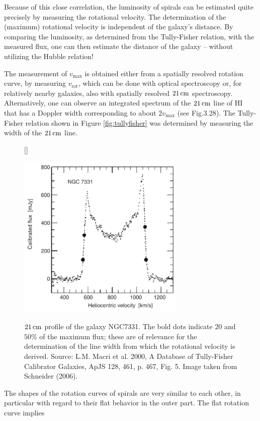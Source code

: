 \documentclass[a4paper,10pt]{article}
\begin{document}
{\noindent}Because of this close correlation, the luminosity of spirals can be estimated quite precisely by measuring the rotational velocity. The determination of the (maximum) rotational velocity is independent of the galaxy’s distance. By comparing the luminosity, as determined from the Tully-Fisher relation, with the measured flux, one can then estimate the distance of the galaxy -- without utilizing the Hubble relation!

{\noindent}The measurement of $v_\mathrm{max}$ is obtained either from a spatially resolved rotation curve, by measuring $v_\mathrm{rot}$, which can be done with optical spectroscopy or, for relatively nearby galaxies, also with spatially resolved $21\,{\rm cm}$ spectroscopy. Alternatively, one can observe an integrated spectrum of the $21\,{\rm cm}$ line of HI that has a Doppler width corresponding to about $2v_\mathrm{max}$ (see Fig.3.28). The Tully-Fisher relation shown in Figure \ref{fig:tullyfisher} was determined by measuring the width of the $21\,{\rm cm}$ line.

\begin{figure}[h]
    [\FBwidth]
    {\caption{\footnotesize{$21\,{\rm cm}$ profile of the galaxy NGC7331. The bold dots indicate $20$ and $50$\% of the maximum flux; these are of relevance for the determination of the line width from which the rotational velocity is derived. Source: L.M. Macri et al. 2000, A Database of Tully-Fisher Calibrator Galaxies, ApJS 128, 461, p. 467, Fig. 5. Image taken from Schneider (2006).}}
    \label{fig:21cmvrot}}
    {\includegraphics[width=8cm]{figures/21cm_vrot.png}}
\end{figure}

{\noindent}The shapes of the rotation curves of spirals are very similar to each other, in particular with regard to their flat behavior in the outer part. The flat rotation curve implies
\end{document}
